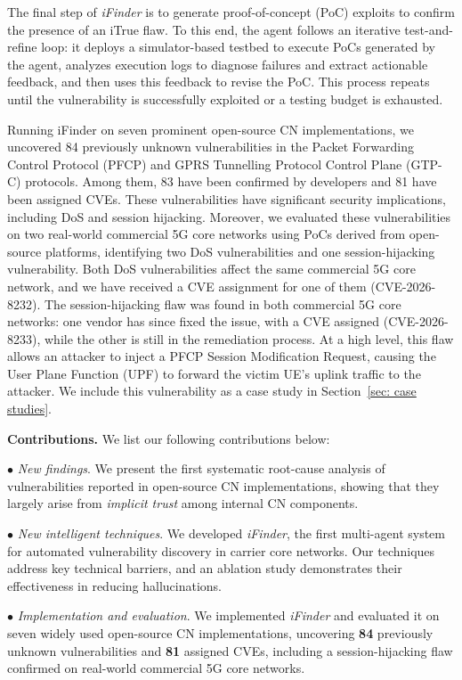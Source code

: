 The final step of \textit{iFinder} is to generate proof-of-concept (PoC) exploits to confirm the presence of an iTrue flaw. To this end, the agent follows an iterative test-and-refine loop: it deploys a simulator-based testbed to execute PoCs generated by the agent, analyzes execution logs to diagnose failures and extract actionable feedback, and then uses this feedback to revise the PoC. This process repeats until the vulnerability is successfully exploited or a testing budget is exhausted.

Running iFinder on seven prominent open-source CN implementations, we uncovered 84 previously unknown vulnerabilities in the Packet Forwarding Control Protocol (PFCP) and GPRS Tunnelling Protocol Control Plane (GTP-C) protocols. 
Among them, 83 have been confirmed by developers and 81 have been assigned CVEs.
These vulnerabilities have significant security implications, including DoS and session hijacking. 
Moreover, we evaluated these vulnerabilities on two real-world commercial 5G core networks using PoCs derived from open-source platforms, identifying two DoS vulnerabilities and one session-hijacking vulnerability. Both DoS vulnerabilities affect the same commercial 5G core network, and we have received a CVE assignment for one of them (CVE-2026-8232).
The session-hijacking flaw was found in both commercial 5G core networks: one vendor has since fixed the issue, with a CVE assigned (CVE-2026-8233), while the other is still in the remediation process. At a high level, this flaw allows an attacker to inject a PFCP Session Modification Request, causing the User Plane Function (UPF) to forward the victim UE’s uplink traffic to the attacker. We include this vulnerability as a case study in Section~\ref{sec: case studies}.

\noindent \textbf{Contributions.} We list our following contributions below:

\vspace{2pt}\noindent$\bullet$ \textit{New findings}. We present the first systematic root-cause analysis of vulnerabilities reported in open-source CN implementations, showing that they largely arise from \textit{implicit trust} among internal CN components.

\vspace{2pt}\noindent$\bullet$ \textit{New intelligent techniques}. We developed \textit{iFinder}, the first multi-agent system for automated vulnerability discovery in carrier core networks. Our techniques address key technical barriers, and an ablation study demonstrates their effectiveness in reducing hallucinations.

\vspace{2pt}\noindent$\bullet$ \textit{Implementation and evaluation}. We implemented \textit{iFinder} and evaluated it on seven widely used open-source CN implementations, uncovering \textbf{84} previously unknown vulnerabilities and \textbf{81} assigned CVEs, including a session-hijacking flaw confirmed on real-world commercial 5G core networks.

